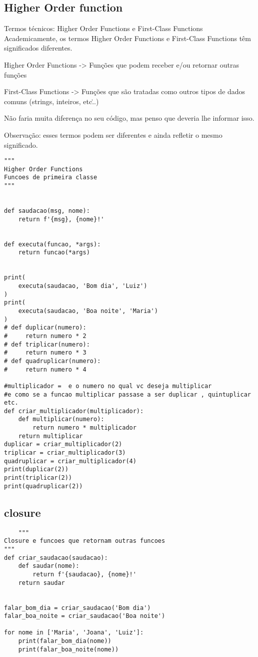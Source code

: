 \documentclass{article}
\begin{document}
\subsection{Higher Order function}
Termos técnicos: Higher Order Functions e First-Class Functions
Academicamente, os termos Higher Order Functions e First-Class Functions têm significados diferentes.

Higher Order Functions -> Funções que podem receber e/ou retornar outras funções

First-Class Functions -> Funções que são tratadas como outros tipos de dados comuns (strings, inteiros, etc\...)

Não faria muita diferença no seu código, mas penso que deveria lhe informar isso.

Observação: esses termos podem ser diferentes e ainda refletir o mesmo significado.
\begin{lstlisting}
"""
Higher Order Functions
Funcoes de primeira classe
"""


def saudacao(msg, nome):
    return f'{msg}, {nome}!'


def executa(funcao, *args):
    return funcao(*args)


print(
    executa(saudacao, 'Bom dia', 'Luiz')
)
print(
    executa(saudacao, 'Boa noite', 'Maria')
)
# def duplicar(numero):
#     return numero * 2
# def triplicar(numero):
#     return numero * 3
# def quadruplicar(numero):
#     return numero * 4

#multiplicador =  e o numero no qual vc deseja multiplicar
#e como se a funcao multiplicar passase a ser duplicar , quintuplicar etc.
def criar_multiplicador(multiplicador):
    def multiplicar(numero):
        return numero * multiplicador
    return multiplicar
duplicar = criar_multiplicador(2)
triplicar = criar_multiplicador(3)
quadruplicar = criar_multiplicador(4)
print(duplicar(2))
print(triplicar(2))
print(quadruplicar(2))
\end{lstlisting}
\subsection{closure}
\begin{lstlisting}
    """
Closure e funcoes que retornam outras funcoes
"""
def criar_saudacao(saudacao):
    def saudar(nome):
        return f'{saudacao}, {nome}!'
    return saudar


falar_bom_dia = criar_saudacao('Bom dia')
falar_boa_noite = criar_saudacao('Boa noite')

for nome in ['Maria', 'Joana', 'Luiz']:
    print(falar_bom_dia(nome))
    print(falar_boa_noite(nome))
\end{lstlisting}
\end{document}
